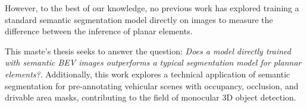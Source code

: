 However, to the best of our knowledge, no previous work has explored training a standard semantic segmentation model directly on  images to measure the difference between the inference of planar elements.

This maste's thesis seeks to answer the question: \textit{Does a model directly trained with semantic BEV images outperforms a typical segmentation model for plannar elements?}. Additionally, this work explores a technical application of  semantic segmentation for pre-annotating vehicular scenes with occupancy, occlusion, and drivable area masks, contributing to the field of monocular 3D object detection.